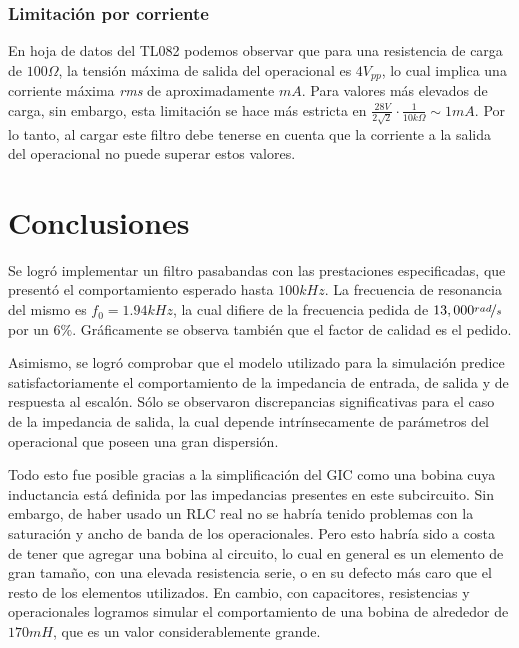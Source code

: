 \documentclass[../../tc_tp3_main.tex]{subfiles}
\begin{document}
\subsubsection{Limitaci\'on por corriente}

En hoja de datos del TL082 podemos observar que para una resistencia de carga de $100\Omega$, la tensi\'on m\'axima de salida del operacional es $4V_{pp}$, lo cual implica una corriente m\'axima \textit{rms} de aproximadamente $mA$. Para valores m\'as elevados de carga, sin embargo, esta limitaci\'on se hace m\'as estricta en $\frac{28V}{2\sqrt{2}} \cdot \frac{1}{10k\Omega} \sim 1mA$. Por lo tanto, al cargar este filtro debe tenerse en cuenta que la corriente a la salida del operacional no puede superar estos valores.


\section{Conclusiones}

Se logr\'o implementar un filtro pasabandas con las prestaciones especificadas, que present\'o el comportamiento esperado hasta $100kHz$. La frecuencia de resonancia del mismo es $f_0 = 1.94kHz$, la cual difiere de la frecuencia pedida de $13,000\nicefrac{rad}{s}$ por un $6\%$. Gr\'aficamente se observa tambi\'en que el factor de calidad es el pedido. \par

Asimismo, se logr\'o comprobar que el modelo utilizado para la simulaci\'on predice satisfactoriamente el comportamiento de la impedancia de entrada, de salida y de respuesta al escal\'on. S\'olo se observaron discrepancias significativas para el caso de la impedancia de salida, la cual depende intr\'insecamente de par\'ametros del operacional que poseen una gran dispersi\'on. \par

Todo esto fue posible gracias a la simplificaci\'on del GIC como una bobina cuya inductancia est\'a definida por las impedancias presentes en este subcircuito. Sin embargo, de haber usado un RLC real no se habr\'ia tenido problemas con la saturaci\'on y ancho de banda de los operacionales. Pero esto habr\'ia sido a costa de tener que agregar una bobina al circuito, lo cual en general es un elemento de gran tama\~no, con una elevada resistencia serie, o en su defecto m\'as caro que el resto de los elementos utilizados. En cambio, con capacitores, resistencias y operacionales logramos simular el comportamiento de una bobina de alrededor de $170mH$, que es un valor considerablemente grande.
\end{document}
